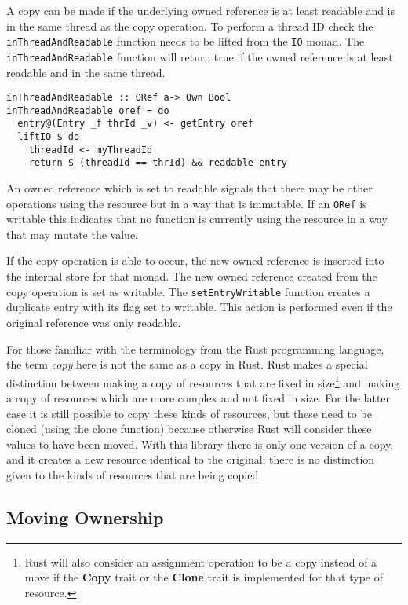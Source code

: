 \documentclass[onehalf,11pt]{beavtex}
\begin{document}
A copy can be made if the underlying owned reference is at least readable and
is in the same thread as the copy operation.
To perform a thread ID check the \texttt{inThreadAndReadable} function
needs to be lifted from the \texttt{IO} monad.
The \texttt{inThreadAndReadable} function will return true if the owned reference
is at least readable and in the same thread.

\begin{verbatim}
inThreadAndReadable :: ORef a-> Own Bool
inThreadAndReadable oref = do
  entry@(Entry _f thrId _v) <- getEntry oref
  liftIO $ do
    threadId <- myThreadId
    return $ (threadId == thrId) && readable entry
\end{verbatim}

An owned reference which is set to readable signals that there may be other
operations using the resource but in a way that is immutable.
If an \texttt{ORef} is writable this indicates that no function is currently
using the resource in a way that may mutate the value.

If the copy operation is able to occur, the new owned reference is inserted into
the internal store for that monad.  The new owned reference created from the copy
operation is set as writable. The \texttt{setEntryWritable} function
creates a duplicate entry with its flag set to writable.
This action is performed even if the original reference was only readable.

For those familiar with the terminology from the Rust programming language, the
term \textit{copy} here is not the same as a copy in Rust. Rust makes a special
distinction between making a copy of resources that are fixed in
size\footnote{Rust will also consider an assignment operation to be a copy
  instead of a move if the \textbf{Copy} trait or the \textbf{Clone} trait is
  implemented for that type of
  resource\cite{rust_docs_clone_trait, rust_book_traits}. 
  }
and making a copy of resources which are more complex and not fixed in size.
For the latter case it is still possible to copy these kinds of resources, but
these need to be cloned (using the clone function) because otherwise Rust will
consider these values to have been moved\cite{rust_book_ownership}.
With this library there is only one version of a copy, and it creates a new
resource identical to the original; there is no distinction given to the kinds
of resources that are being copied.

\subsection{Moving Ownership}
\end{document}
